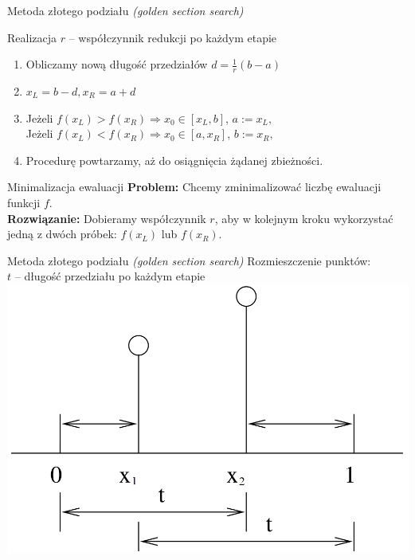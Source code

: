   \begin{frame}{Metoda złotego podziału \emph{(golden section search)}}
    \begin{block}{Realizacja}
      $r$ -- współczynnik redukcji po każdym etapie
      \begin{enumerate}
        \item Obliczamy nową długość przedziałów $ d = \frac{1}{r}(b - a) $
        \item $ x_L = b - d, x_R = a + d $
        \item Jeżeli $ f(x_L) > f(x_R) \Rightarrow x_0 \in [x_L, b] $,
              $ a := x_L \text{, } $\\
              Jeżeli $ f(x_L) < f(x_R) \Rightarrow x_0 \in [a, x_R] $,
              $ b := x_R \text{, } $
        \item Procedurę powtarzamy, aż do osiągnięcia żądanej zbieżności.
      \end{enumerate}
    \end{block}
    \begin{block}{Minimalizacja ewaluacji}
      \textbf{Problem:} Chcemy zminimalizować liczbę ewaluacji funkcji $f$.\\
      \textbf{Rozwiązanie:} Dobieramy współczynnik $r$, aby w kolejnym kroku wykorzystać jedną z dwóch próbek: $f(x_L)$ lub $f(x_R)$.
    \end{block}
  \end{frame}
  \begin{frame}{Metoda złotego podziału \emph{(golden section search)}}
    Rozmieszczenie punktów:\\
    $t$ -- długość przedziału po każdym etapie\\
    \centering
    \includegraphics[height=0.6\textheight]{img/17/f_uni2}
  \end{frame}

